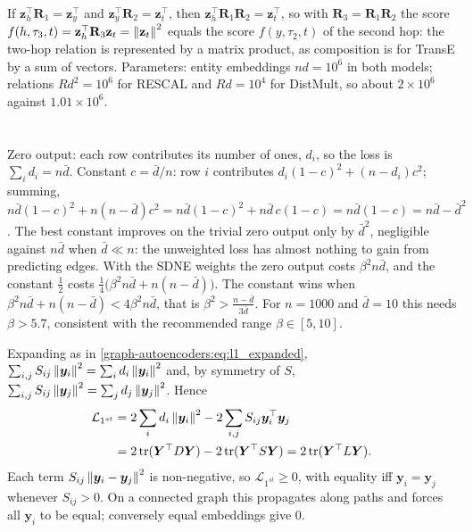 If $\mathbf z_h^\top\mathbf R_1 = \mathbf z_y^\top$ and $\mathbf z_y^\top\mathbf R_2 = \mathbf z_t^\top$, then $\mathbf z_h^\top\mathbf R_1\mathbf R_2 = \mathbf z_t^\top$, so with $\mathbf R_3 = \mathbf R_1\mathbf R_2$ the score $f(h, \tau_3, t) = \mathbf z_h^\top\mathbf R_3\mathbf z_t = \left\|\mathbf z_t\right\|^2$ equals the score $f(y, \tau_2, t)$ of the second hop: the two-hop relation is represented by a matrix product, as composition is for TransE by a sum of vectors. Parameters: entity embeddings $nd = 10^6$ in both models; relations $Rd^2 = 10^6$ for RESCAL and $Rd = 10^4$ for DistMult, so about $2\times10^6$ against $1.01\times10^6$.

\section{}

Zero output: each row contributes its number of ones, $d_i$, so the loss is $\sum_id_i = n\bar d$. Constant $c = \bar d/n$: row $i$ contributes $d_i(1-c)^2 + (n - d_i)c^2$; summing, $n\bar d(1-c)^2 + n(n - \bar d)c^2 = n\bar d(1-c)^2 + n\bar d\,c(1-c) = n\bar d(1 - c) = n\bar d - \bar d^2$. The best constant improves on the trivial zero output only by $\bar d^2$, negligible against $n\bar d$ when $\bar d \ll n$: the unweighted loss has almost nothing to gain from predicting edges. With the SDNE weights the zero output costs $\beta^2n\bar d$, and the constant $\frac12$ costs $\frac14\bigl(\beta^2n\bar d + n(n - \bar d)\bigr)$. The constant wins when $\beta^2n\bar d + n(n-\bar d) < 4\beta^2n\bar d$, that is $\beta^2 > \frac{n - \bar d}{3\bar d}$. For $n = 1000$ and $\bar d = 10$ this needs $\beta > 5.7$, consistent with the recommended range $\beta \in [5, 10]$.

Expanding as in \cref{graph-autoencoders:eq:l1_expanded}, $\sum_{i,j}S_{ij}\left\|\bm y_i\right\|^2 = \sum_id_i\left\|\bm y_i\right\|^2$ and, by symmetry of $S$, $\sum_{i,j}S_{ij}\left\|\bm y_j\right\|^2 = \sum_jd_j\left\|\bm y_j\right\|^2$. Hence
\begin{align*}
\mathcal L_{1^{st}} &= 2\sum_id_i\left\|\bm y_i\right\|^2 - 2\sum_{i,j}S_{ij}\bm y_i^\top\bm y_j\\
&= 2\operatorname{tr}(\bm Y^\top D\bm Y) - 2\operatorname{tr}(\bm Y^\top S\bm Y) = 2\operatorname{tr}(\bm Y^\top L\bm Y).
\end{align*} Each term $S_{ij}\left\|\bm y_i - \bm y_j\right\|^2$ is non-negative, so $\mathcal L_{1^{st}} \ge 0$, with equality iff $\bm y_i = \bm y_j$ whenever $S_{ij} > 0$. On a connected graph this propagates along paths and forces all $\bm y_i$ to be equal; conversely equal embeddings give $0$.

